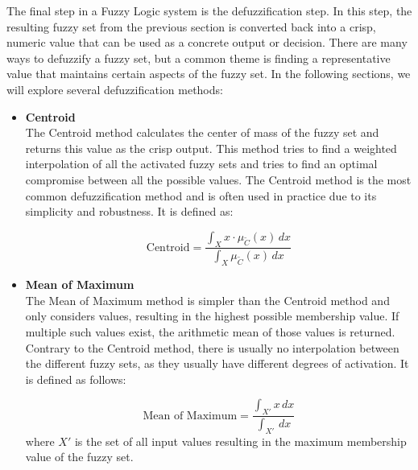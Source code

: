 The final step in a Fuzzy Logic system is the defuzzification step. In this step, the resulting fuzzy set from the previous section is converted back into a crisp, numeric value that can be used as a concrete output or decision. There are many ways to defuzzify a fuzzy set, but a common theme is finding a representative value that maintains certain aspects of the fuzzy set. In the following sections, we will explore several defuzzification methods:

\begin{itemize}
      \item \textbf{Centroid} \\
            The Centroid method calculates the center of mass of the fuzzy set and returns this value as the crisp output. This method tries to find a weighted interpolation of all the activated fuzzy sets and tries to find an optimal compromise between all the possible values. The Centroid method is the most common defuzzification method and is often used in practice due to its simplicity and robustness. It is defined as:

            \begin{equation}
                  \text{Centroid} = \frac{\int_X x \cdot \mu_{\tilde{C}}(x) \, dx}{\int_X \mu_{\tilde{C}}(x) \, dx}
            \end{equation}

      \item \textbf{Mean of Maximum} \\
            The Mean of Maximum method is simpler than the Centroid method and only considers values, resulting in the highest possible membership value. If multiple such values exist, the arithmetic mean of those values is returned. Contrary to the Centroid method, there is usually no interpolation between the different fuzzy sets, as they usually have different degrees of activation. It is defined as follows:

            \begin{equation}
                  \text{Mean of Maximum} = \frac{\int_{X'} x \, dx}{\int_{X'}  \, dx}
            \end{equation}
            where $X'$ is the set of all input values resulting in the maximum membership value of the fuzzy set.
\end{itemize}
